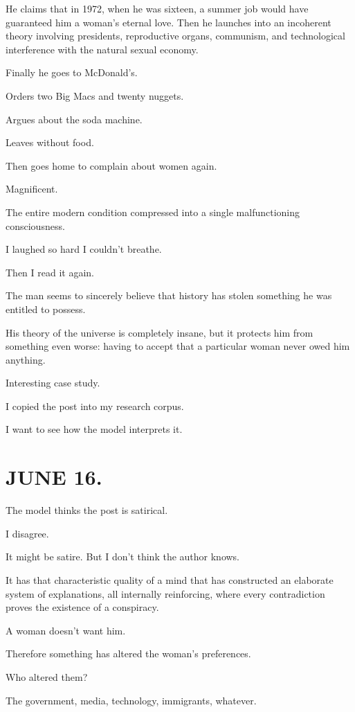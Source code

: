 \documentclass[11pt,oneside]{book}
\begin{document}
He claims that in 1972, when he was sixteen, a summer job would have guaranteed him a woman's eternal love. Then he launches into an incoherent theory involving presidents, reproductive organs, communism, and technological interference with the natural sexual economy.

Finally he goes to McDonald's.

Orders two Big Macs and twenty nuggets.

Argues about the soda machine.

Leaves without food.

Then goes home to complain about women again.

Magnificent.

The entire modern condition compressed into a single malfunctioning consciousness.

I laughed so hard I couldn't breathe.

Then I read it again.

The man seems to sincerely believe that history has stolen something he was entitled to possess.

His theory of the universe is completely insane, but it protects him from something even worse: having to accept that a particular woman never owed him anything.

Interesting case study.

I copied the post into my research corpus.

I want to see how the model interprets it.

\section*{JUNE 16.}

The model thinks the post is satirical.

I disagree.

It might be satire. But I don't think the author knows.

It has that characteristic quality of a mind that has constructed an elaborate system of explanations, all internally reinforcing, where every contradiction proves the existence of a conspiracy.

A woman doesn't want him.

Therefore something has altered the woman's preferences.

Who altered them?

The government, media, technology, immigrants, whatever.
\end{document}
